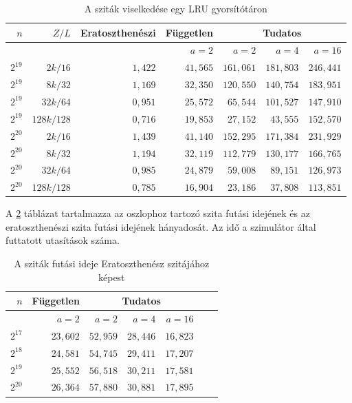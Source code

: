 \documentclass[12pt]{report}
\begin{document}
\begin{table}[ht]
\centering
\caption{A sziták viselkedése egy LRU gyorsítótáron}
\label{table-bucket-sieves}
\begin{tabular}{|r|r|r|r|r|r|r|}
\hline
$n$ & $Z/L$ &Eratoszthenészi & Független & \multicolumn{3}{|c|}{Tudatos} \\
\hline
 & &  & $a=2$ & $a=2$ & $a=4$ & $a=16$ \\
\hline
$2^{19}$ &    $2k/16$ & $1,422$ & $41,565$ & $161,061$ & $181,803$ & $246,441$ \\
\hline
$2^{19}$ &    $8k/32$ & $1,169$ & $32,350$ & $120,550$ & $140,754$ & $183,951$ \\
\hline
$2^{19}$ &   $32k/64$ & $0,951$ & $25,572$ &  $65,544$ & $101,527$ & $147,910$ \\
\hline
$2^{19}$ & $128k/128$ & $0,716$ & $19,853$ &  $27,152$ &  $43,555$ & $152,570$ \\
\hline
$2^{20}$ &    $2k/16$ & $1,439$ & $41,140$ & $152,295$ & $171,384$ & $231,929$ \\
\hline
$2^{20}$ &    $8k/32$ & $1,194$ & $32,119$ & $112,779$ & $130,177$ & $166,765$ \\
\hline
$2^{20}$ &   $32k/64$ & $0,985$ & $24,879$ &  $59,008$ &  $89,151$ & $126,973$ \\
\hline
$2^{20}$ & $128k/128$ & $0,785$ & $16,904$ &  $23,186$ &  $37,808$ & $113,851$ \\
\hline
\end{tabular}
\end{table}

A \ref{table-bucket-sieves-elapsed-cycles} táblázat tartalmazza
az oszlophoz tartozó szita futási idejének és az eratoszthenészi szita futási idejének hányadosát.
Az idő a szimulátor által futtatott utasítások száma.

\begin{table}[ht]
\centering
\caption{A sziták futási ideje Eratoszthenész szitájához képest}
\label{table-bucket-sieves-elapsed-cycles}
\begin{tabular}{|r|r|r|r|r|r|r|}
\hline
$n$ & Független & \multicolumn{3}{|c|}{Tudatos} \\
\hline
 & $a=2$ & $a=2$ & $a=4$ & $a=16$ \\
\hline
$2^{17}$ & $23,602$ & $52,959$ & $28,446$ & $16,823$ \\
\hline
$2^{18}$ & $24,581$ & $54,745$ & $29,411$ & $17,207$ \\
\hline
$2^{19}$ & $25,552$ & $56,518$ & $30,211$ & $17,581$ \\
\hline
$2^{20}$ & $26,364$ & $57,880$ & $30,881$ & $17,895$ \\
\hline
\end{tabular}
\end{table}
\end{document}
